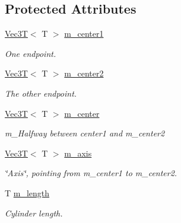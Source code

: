 \subsection*{Protected Attributes}
\begin{DoxyCompactItemize}
\item 
\mbox{\label{classCylinderSDF_ac69f666234c9625306153be47295cdbc}} 
\hyperlink{classVec3T}{Vec3T}$<$ T $>$ \hyperlink{classCylinderSDF_ac69f666234c9625306153be47295cdbc}{m\+\_\+center1}
\begin{DoxyCompactList}\small\item\em One endpoint. \end{DoxyCompactList}\item 
\mbox{\label{classCylinderSDF_a02b8aea5350ad933ed53abea6cb58103}} 
\hyperlink{classVec3T}{Vec3T}$<$ T $>$ \hyperlink{classCylinderSDF_a02b8aea5350ad933ed53abea6cb58103}{m\+\_\+center2}
\begin{DoxyCompactList}\small\item\em The other endpoint. \end{DoxyCompactList}\item 
\mbox{\label{classCylinderSDF_a38e901843de5889a3c3eee35bc2a534c}} 
\hyperlink{classVec3T}{Vec3T}$<$ T $>$ \hyperlink{classCylinderSDF_a38e901843de5889a3c3eee35bc2a534c}{m\+\_\+center}
\begin{DoxyCompactList}\small\item\em m\+\_\+\+Halfway between center1 and m\+\_\+center2 \end{DoxyCompactList}\item 
\mbox{\label{classCylinderSDF_a034a7baec832c8a19fd2cd33ec1358eb}} 
\hyperlink{classVec3T}{Vec3T}$<$ T $>$ \hyperlink{classCylinderSDF_a034a7baec832c8a19fd2cd33ec1358eb}{m\+\_\+axis}
\begin{DoxyCompactList}\small\item\em \char`\"{}\+Axis\char`\"{}, pointing from m\+\_\+center1 to m\+\_\+center2. \end{DoxyCompactList}\item 
\mbox{\label{classCylinderSDF_a715c9888a921083d827bad94b4660626}} 
T \hyperlink{classCylinderSDF_a715c9888a921083d827bad94b4660626}{m\+\_\+length}
\begin{DoxyCompactList}\small\item\em Cylinder length. \end{DoxyCompactList}\item 

\end{DoxyCompactItemize}
